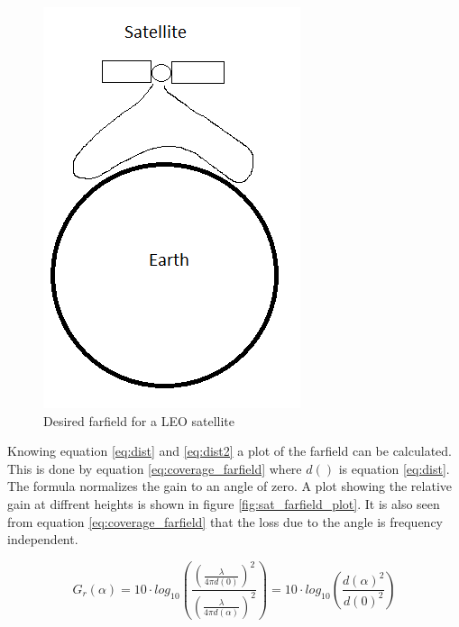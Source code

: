 \begin{figure}[H]
\centering 
\includegraphics[scale = 0.7]{figures/linkbudget/sat_farfield.png}
\caption{Desired farfield for a LEO satellite}
\label{fig:sat_farfield}
\end{figure} 

Knowing equation \eqref{eq:dist} and \eqref{eq:dist2} a plot of the farfield can be calculated. This is done by equation \eqref{eq:coverage_farfield} where $d()$ is equation \eqref{eq:dist}. The formula normalizes the gain to an angle of zero. A plot showing the relative gain at diffrent heights is shown in figure \ref{fig:sat_farfield_plot}. It is also seen from equation \ref{eq:coverage_farfield} that the loss due to the angle is frequency independent.  
  
\begin{equation}\label{eq:coverage_farfield}
G_r(\alpha) = 10\cdot log_{10}(\frac{(\frac{\lambda}{4 \pi d(0) })^2}{(\frac{\lambda}{4 \pi d(\alpha) })^2}) = 10\cdot log_{10}(\frac{d(\alpha)^2}{d(0)^2})
\end{equation}
 



